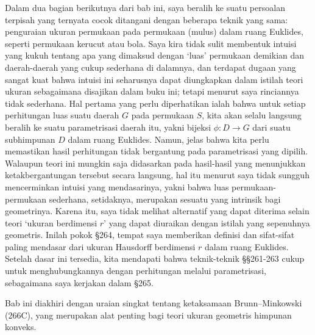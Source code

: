 Dalam dua bagian berikutnya dari bab ini, saya beralih ke suatu persoalan
terpisah yang ternyata cocok ditangani dengan beberapa teknik yang sama:
penguraian ukuran permukaan pada permukaan (mulus) dalam ruang Euklides,
seperti permukaan kerucut atau bola. Saya kira tidak sulit membentuk intuisi
yang kukuh tentang apa yang dimaksud dengan `luas' permukaan demikian dan
daerah-daerah yang cukup sederhana di dalamnya, dan terdapat dugaan yang
sangat kuat bahwa intuisi ini seharusnya dapat diungkapkan dalam istilah
teori ukuran sebagaimana disajikan dalam buku ini; tetapi menurut saya
rinciannya tidak sederhana. Hal pertama yang perlu diperhatikan ialah bahwa
untuk setiap perhitungan luas suatu daerah $G$ pada permukaan $S$, kita akan
selalu langsung beralih ke suatu parametrisasi daerah itu, yakni bijeksi
$\phi:D\to G$ dari suatu subhimpunan $D$ dalam ruang Euklides. Namun, jelas
bahwa kita perlu memastikan hasil perhitungan tidak bergantung pada
parametrisasi yang dipilih. Walaupun teori ini mungkin saja didasarkan pada
hasil-hasil yang menunjukkan ketakbergantungan tersebut secara langsung,
hal itu menurut saya tidak sungguh mencerminkan intuisi yang mendasarinya,
yakni bahwa luas permukaan-permukaan sederhana, setidaknya, merupakan
sesuatu yang intrinsik bagi geometrinya. Karena itu, saya tidak melihat
alternatif yang dapat diterima selain teori `ukuran berdimensi $r$' yang
dapat diuraikan dengan istilah yang sepenuhnya geometris. Inilah pokok
\S264, tempat saya memberikan definisi dan sifat-sifat paling mendasar dari
ukuran Hausdorff berdimensi $r$ dalam ruang Euklides. Setelah dasar ini
tersedia, kita mendapati bahwa teknik-teknik \S\S261-263 cukup untuk
menghubungkannya dengan perhitungan melalui parametrisasi, sebagaimana saya
kerjakan dalam \S265.

Bab ini diakhiri dengan uraian singkat tentang ketaksamaan Brunn--Minkowski
(266C), yang merupakan alat penting bagi teori ukuran geometris himpunan
konveks.

\discrpage
